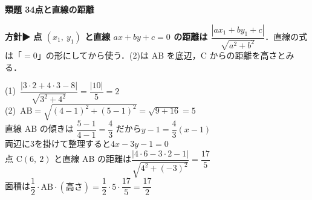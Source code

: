 \documentclass[a4paper,11pt]{ltjsarticle}
\newcommand{\ans}[2]{\Needspace{5\baselineskip}\vspace{6pt}%
  {\sffamily\bfseries 類題 #1\quad #2}\par}
\newcommand{\point}[1]{\textsf{\bfseries ▶ #1}}
\newcommand{\ax}[4]{\draw[->] (#1,0)--(#2,0) node[right]{\scriptsize $x$};
  \draw[->] (0,#3)--(0,#4) node[above]{\scriptsize $y$};
  \node[below left] at (0,0){\scriptsize O};}
\begin{document}
\ans{34}{点と直線の距離}
\begin{kai}
\textbf{方針}\quad \point{点 $(x_1,\ y_1)$ と直線 $ax+by+c=0$ の距離は $\dfrac{|ax_1+by_1+c|}{\sqrt{a^2+b^2}}$}．直線の式は「$=0$」の形にしてから使う．(2)は AB を底辺，C からの距離を高さとみる．\\[2pt]
\begin{center}
\end{center}
(1)\ $\dfrac{|3\cdot2+4\cdot3-8|}{\sqrt{3^2+4^2}}=\dfrac{|10|}5=2$\\[2pt]
(2)\ $\mathrm{AB}=\sqrt{(4-1)^2+(5-1)^2}=\sqrt{9+16}=5$\\
\hspace*{1.5em}直線 AB の傾きは $\dfrac{5-1}{4-1}=\dfrac43$ だから\quad $y-1=\dfrac43(x-1)$\\
\hspace*{1.5em}両辺に3を掛けて整理すると\quad $4x-3y-1=0$\\
\hspace*{1.5em}点 $\mathrm C(6,\ 2)$ と直線 AB の距離は\quad $\dfrac{|4\cdot6-3\cdot2-1|}{\sqrt{4^2+(-3)^2}}=\dfrac{17}5$\\
\hspace*{1.5em}面積は\quad $\dfrac12\cdot\mathrm{AB}\cdot(\text{高さ})=\dfrac12\cdot5\cdot\dfrac{17}5=\dfrac{17}2$
\end{kai}
\end{document}
